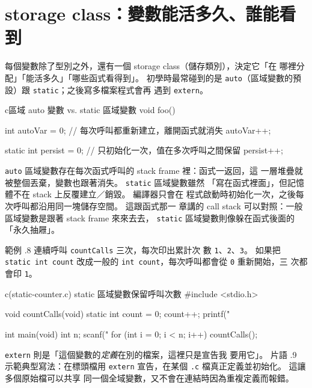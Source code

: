 \section{storage class：變數能活多久、誰能看到}
\label{sec:ext-storage-class}

每個變數除了型別之外，還有一個 storage class（儲存類別），決定它「在
哪裡分配」「能活多久」「哪些函式看得到」。 初學時最常碰到的是
\texttt{auto}（區域變數的預設）跟 \texttt{static}；之後寫多檔案程式會再
遇到 \texttt{extern}。

\begin{code}{c}{區域 auto 變數 vs. static 區域變數}
void foo() {
    int autoVar = 0;      // 每次呼叫都重新建立，離開函式就消失
    autoVar++;

    static int persist = 0;  // 只初始化一次，值在多次呼叫之間保留
    persist++;
}
\end{code}

\texttt{auto} 區域變數存在每次函式呼叫的 stack frame 裡：函式一返回，這
一層堆疊就被整個丟棄，變數也跟著消失。 \texttt{static} 區域變數雖然
「寫在函式裡面」，但記憶體不在 stack 上反覆建立／銷毀。 編譯器只會在
程式啟動時初始化一次，之後每次呼叫都沿用同一塊儲存空間。 這跟函式那一
章講的 call stack 可以對照：一般區域變數是跟著 stack frame 來來去去，
\texttt{static} 區域變數則像躲在函式後面的「永久抽屜」。

範例 \thechapter.8 連續呼叫 \texttt{countCalls} 三次，每次印出累計次
數 \texttt{1}、\texttt{2}、\texttt{3}。 如果把 \texttt{static int count}
改成一般的 \texttt{int count}，每次呼叫都會從 \texttt{0} 重新開始，三
次都會印 \texttt{1}。

\begin{example}{c}{(static-counter.c) static 區域變數保留呼叫次數}
#include <stdio.h>

void countCalls(void) {
    static int count = 0;
    count++;
    printf("%
}

int main(void) {
    int n;
    scanf("%
    for (int i = 0; i < n; i++) {
        countCalls();
    }
}
\end{example}


\texttt{extern} 則是「這個變數的\emph{定義}在別的檔案，這裡只是宣告我
要用它」。 片語 \thechapter.9 示範典型寫法：在標頭檔用 \texttt{extern}
宣告，在某個 \texttt{.c} 檔真正定義並初始化。 這讓多個原始檔可以共享
同一個全域變數，又不會在連結時因為重複定義而報錯。

